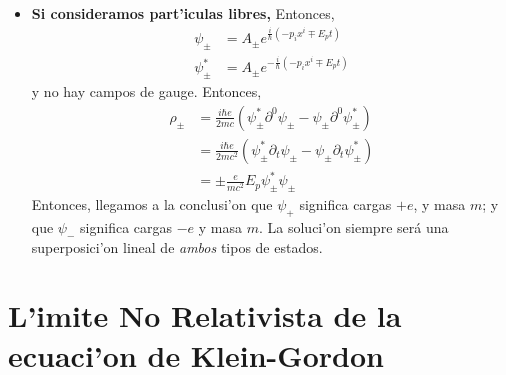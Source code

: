 \begin{itemize}
\item \textbf{Si consideramos part'iculas libres, }Entonces,
\begin{align*}
\psi_{\pm}  & =A_{\pm}e^{\frac{i}{\hbar}\left(  -p_{i}x^{i}\mp E_{p}t\right)
}\\
\psi_{\pm}^{\ast}  & =A_{\pm}e^{-\frac{i}{\hbar}\left(  -p_{i}x^{i}\mp
E_{p}t\right)  }%
\end{align*}
y no hay campos de gauge. Entonces,
\begin{align*}
\rho_{\pm}  & =\frac{i\hbar e}{2mc}\left(  \psi_{\pm}^{\ast}\partial
^{0}\psi_{\pm}-\psi_{\pm}\partial^{0}\psi_{\pm}^{\ast}\right) \\
& =\frac{i\hbar e}{2mc^{2}}\left(  \psi_{\pm}^{\ast}\partial_{t}\psi_{\pm
}-\psi_{\pm}\partial_{t}\psi_{\pm}^{\ast}\right) \\
& =\pm\frac{e}{mc^{2}}E_{p}\psi_{\pm}^{\ast}\psi_{\pm}%
\end{align*}
Entonces, llegamos a la conclusi'on que $\psi_{+}$ significa cargas $+e$, y
masa $m$; y que $\psi_{-}$ significa cargas $-e$ y masa $m$. La
soluci'on siempre ser\'{a} una superposici'on lineal de \emph{ambos}
tipos de estados.
\end{itemize}

\section{L'imite No Relativista de la ecuaci'on de Klein-Gordon}

